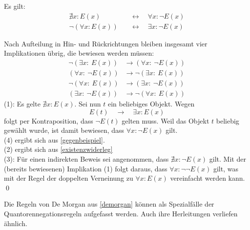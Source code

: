   
  
    \begin{sat}
Es gilt:
 \begin{align*}
  \nexists x: E(x) \quad& \leftrightarrow\quad \forall x: \neg E(x) \\
    \neg (\forall x: E(x)) \quad& \leftrightarrow\quad \exists x: \neg E(x)
 \end{align*}
 \end{sat}
 \begin{bew}[(*)]
 Nach Aufteilung in Hin- und Rückrichtungen bleiben insgesamt vier Implikationen übrig, die bewiesen werden müssen:
 \begin{align}
    \neg (\exists x:\ E(x)) & \to (\forall x:\ \neg E(x)) \tag{1}\\
        (\forall x:\ \neg E(x)) & \to \neg (\exists x:\ E(x))  \tag{2}\\
    \neg (\forall x:\ E(x)) & \to (\exists x:\ \neg E(x))\tag{3} \\
        (\exists x:\ \neg E(x)) & \to \neg (\forall x:\ E(x))\tag{4}
 \end{align}
(1): Es gelte $\nexists x : E(x)$. Sei nun $t$ ein beliebiges Objekt. Wegen
 \[ E(t) \quad \to \quad \exists x: E(x) \]
folgt per Kontraposition, dass $\neg E(t)$ gelten muss. Weil das Objekt $t$ beliebig gewählt wurde, ist damit bewiesen, dass $\forall x: \neg E(x)$ gilt. \\[0.5em]
(4) ergibt sich aus \cref{gegenbeispiel}. \\[0.5em]
(2) ergibt sich aus \cref{existenzwiderleg} \\[0.5em]
(3): Für einen indirekten Beweis sei angenommen, dass $\nexists x: \neg E(x)$ gilt. Mit der (bereits bewiesenen) Implikation (1) folgt daraus, dass $\forall x: \neg\neg E(x)$ gilt, was mit der Regel der doppelten Verneinung zu $\forall x: E(x)$ vereinfacht werden kann. \qed 
 \end{bew}

 
 \begin{bem}[*]
Die Regeln von De Morgan aus \cref{demorgan} können als Spezialfälle der Quantorennegationsregeln aufgefasst werden. Auch ihre Herleitungen verliefen ähnlich.
 \end{bem}
 
 


